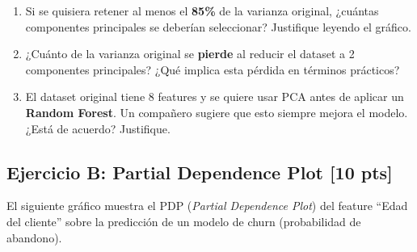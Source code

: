 \documentclass[11pt,a4paper]{article}
\newcommand{\puntaje}[1]{\textbf{[#1 pts]}}
\begin{document}
\vspace{0.3cm}

\begin{enumerate}[label=\textbf{\alph*)}]
  \item Si se quisiera retener al menos el \textbf{85\%} de la varianza original, ¿cu\'antas componentes principales se deber\'ian seleccionar? Justifique leyendo el gr\'afico.

  \vspace{2.5cm}

  \item ¿Cu\'anto de la varianza original se \textbf{pierde} al reducir el dataset a 2 componentes principales? ¿Qu\'e implica esta p\'erdida en t\'erminos pr\'acticos?

  \vspace{2.5cm}

  \item El dataset original tiene 8 features y se quiere usar PCA antes de aplicar un \textbf{Random Forest}. Un compa\~nero sugiere que esto siempre mejora el modelo. ¿Est\'a de acuerdo? Justifique.

  \vspace{2.5cm}
\end{enumerate}

\subsection*{Ejercicio B: Partial Dependence Plot \puntaje{10}}

El siguiente gr\'afico muestra el PDP (\textit{Partial Dependence Plot}) del feature ``Edad del cliente'' sobre la predicci\'on de un modelo de churn (probabilidad de abandono).

\vspace{0.3cm}
\begin{center}
\end{center}

\vspace{0.3cm}
\end{document}
